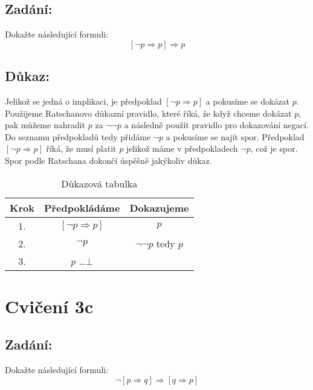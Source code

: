 \documentclass{article}
\begin{document}
\subsection{Zadání:}
Dokažte následující formuli:
$$[\neg p \Rightarrow p] \Rightarrow p$$

\subsection{Důkaz:}
Jelikož se jedná o implikaci, je předpoklad $[\neg p \Rightarrow p]$ a pokusíme se dokázat $p$. Použijeme Ratschanovo důkazní pravidlo, které říká, že když chceme dokázat $p$, pak můžeme nahradit $p$ za $\neg \neg p$ a následně použít pravidlo pro dokazování negací. Do seznamu předpokladů tedy přidáme $\neg p$ a pokusíme se najít spor. Předpoklad $[\neg p \Rightarrow p]$ říká, že musí platit $p$ jelikož máme v předpokladech $\neg p$, což je spor. Spor podle Ratschana dokončí úspěšně jakýkoliv důkaz.

\begin{table}[H]\centering

    \caption{Důkazová tabulka}

\begin{tabular}{|c|c|c|}
    
    
        \hline \textbf{Krok} & \textbf{Předpokládáme} & \textbf{Dokazujeme} \\ \hline \hline
    	1. & $[\neg p \Rightarrow p]$ & $p$ \\ \hline
    	2. & $\neg p$ & $\neg \neg p$ tedy $p$ \\ \hline
    	3. & $p$ \dots $\bot$ & \\ \hline
    
            
    	\end{tabular}
\end{table}

\section{Cvičení 3c}

\subsection{Zadání:}

Dokažte následující formuli:
$$\neg [p \Rightarrow q] \Rightarrow [q \Rightarrow p]$$
\end{document}
